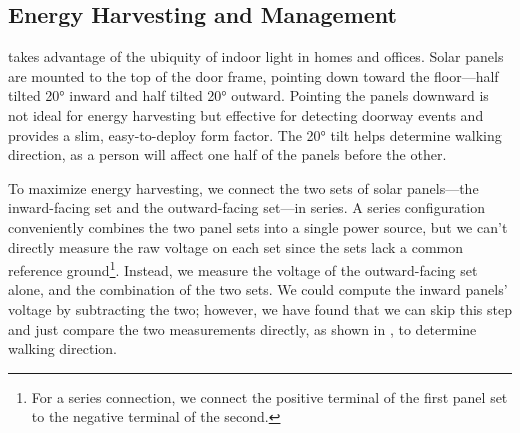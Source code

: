 \subsection{Energy Harvesting and Management}
\sysname takes advantage of the ubiquity of indoor light in homes and offices.
Solar panels are mounted to the top of the door frame, pointing down toward the floor---half tilted \ang{20} inward and half tilted \ang{20} outward.
Pointing the panels downward is not ideal for energy harvesting but effective for detecting doorway events and provides a slim, easy-to-deploy form factor.
The \ang{20} tilt helps \sysname determine walking direction, as a person will affect one half of the panels before the other.

To maximize energy harvesting, we connect the two sets of solar panels---the inward-facing set and the outward-facing set---in series.
A series configuration conveniently combines the two panel sets into a single power source, but we can't directly measure the raw voltage on each set since the sets lack a common reference ground\footnote{For a series connection, we connect the positive terminal of the first panel set to the negative terminal of the second.}.
Instead, we measure the voltage of the outward-facing set alone, and the combination of the two sets.
We could compute the inward panels' voltage by subtracting the two; however, we have found that we can skip this step and just compare the two measurements directly, as shown in , to determine walking direction.


